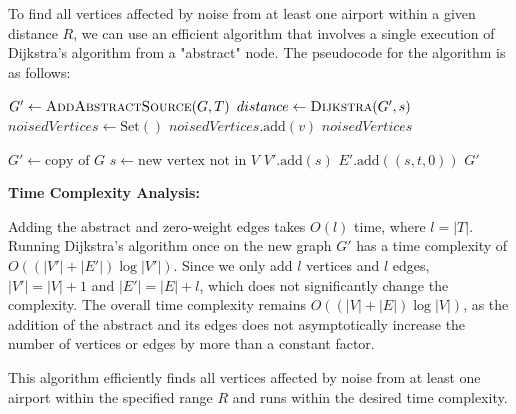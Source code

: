 \begin{solution}

    To find all vertices affected by noise from at least one airport within a given distance $R$, we can use an efficient algorithm that involves a single execution of Dijkstra's algorithm from a "abstract" node. 
    The pseudocode for the algorithm is as follows:

    \begin{algorithmic}[1]
        \State $G' \gets \Call{AddAbstractSource}{G, T}$
        \State $distance \gets \Call{Dijkstra}{G', s}$
        \State $noisedVertices \gets \text{Set}()$
        \State $noisedVertices.\text{add}(v)$
        \EndIf
        \EndFor
        \State \Return $noisedVertices$
        \EndFunction
        \Statex
        
        \State $G' \gets \text{copy of } G$
        \State $s \gets \text{new vertex not in } V$
        \State $V'.\text{add}(s)$
        \State $E'.\text{add}((s, t, 0))$
        \EndFor
        \State \Return $G'$
        \EndFunction
    \end{algorithmic}

    \pagebreak

    \textbf{Time Complexity Analysis:}

    Adding the abstract and zero-weight edges takes $O(l)$ time, where $l = |T|$. Running Dijkstra's algorithm once on the new graph $G'$ has a time complexity of $O((|V'| + |E'|) \log |V'|)$. Since we only add $l$ vertices and $l$ edges, $|V'| = |V| + 1$ and $|E'| = |E| + l$, which does not significantly change the complexity. The overall time complexity remains $O((|V| + |E|) \log |V|)$, as the addition of the abstract and its edges does not asymptotically increase the number of vertices or edges by more than a constant factor.

    This algorithm efficiently finds all vertices affected by noise from at least one airport within the specified range $R$ and runs within the desired time complexity.


\end{solution}




